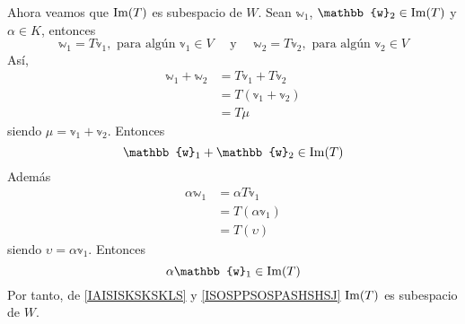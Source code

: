 \begin{theorem}
    Ahora veamos que $\operatorname{Im}(T)$ es subespacio de $W$. Sean $\mathbb{w}_1$, $\mathbb{w}_2 \in \Ima(T)$ y $\alpha \in K$, entonces
    \begin{equation}
        \mathbb{w}_1 = T\mathbb{v}_1, \text{ para algún } \mathbb{v}_1 \in V \quad \text{ y } \quad \mathbb{w}_2 = T\mathbb{v}_2, \text{ para algún } \mathbb{v}_2 \in V
    \end{equation}
    Así,
    \begin{align*}
        \mathbb{w}_1 + \mathbb{w}_2 & = T\mathbb{v}_1 + T\mathbb{v}_2 \\
        & = T(\mathbb{v}_1 + \mathbb{v}_2) \\
        & = T\mathbb{\mu}
    \end{align*}
    siendo $\mathbb{\mu} = \mathbb{v}_1 + \mathbb{v}_2$. Entonces
    \begin{equation}
        \mathbb{w}_1 + \mathbb{w}_2 \in \Ima(T) \label{IAISISKSKSKLS}
    \end{equation}
    Además
    \begin{align*}
        \alpha \mathbb{w}_1 & = \alpha T\mathbb{v}_1 \\
        & = T(\alpha \mathbb{v}_1) \\
        & = T(\mathbb{\upsilon})
    \end{align*}
    siendo $\mathbb{\upsilon} = \alpha \mathbb{v}_1$. Entonces
    \begin{equation}
        \alpha \mathbb{w}_1 \in \Ima(T) \label{ISOSPPSOSPASHSHSJ}
    \end{equation}
    Por tanto, de \eqref{IAISISKSKSKLS} y \eqref{ISOSPPSOSPASHSHSJ} $\operatorname{Im}(T)$ es subespacio de $W$.
\end{theorem}

